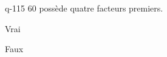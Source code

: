 \begin{truefalse}{q-115}
$60$ possède quatre facteurs premiers.
\item Vrai
\item* Faux
\end{truefalse}

